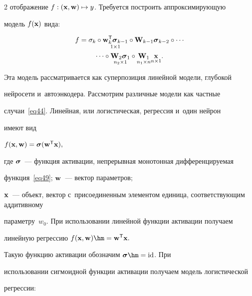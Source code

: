 \begin{multicols}{2}
отображение $f:({\mathbf{x}},{\mathbf{w}})\mapsto y$. Требуется построить аппроксимирующую 


модель $f({\mathbf{x}})$ вида:


\begin{multline}


\label{eq44}


f = \sigma_k\circ\underset{1\times1}{\wm_k^\mathsf{T}\sigmab_{k-


1}}\circ\mathbf{W}_{k-1}\sigmab_{k-2}\circ\cdots\\


\cdots \circ\underset{n_2 \times 


1}{\mathbf{W}_2\sigmab_1}\circ \underset{n_1 \times n}{\mathbf{W}_1}\underset{n \times 1}{\x}.


\end{multline}


Эта модель рассматривается как суперпозиция линейной модели, глубокой 


нейросети и~автоэнкодера. Рассмотрим различные модели как частные 


случаи~\eqref{eq44}. Линейная, или логистическая, регрессия и~один нейрон 


имеют вид




 $f({\mathbf{x}},{\mathbf{w}})={\boldsymbol{\sigma}}({\mathbf{w}}^\mathsf{T}{\mathbf{x}}),$




где ${\boldsymbol{\sigma}}$~--- функция активации, непрерывная монотонная дифференцируемая 


функция~\eqref{eq49};  ${\mathbf{w}}$~--- вектор параметров; 


${\mathbf{x}}$~--- объект, вектор с~присоединенным элементом единица, соответствующим аддитивному 


параметру~$w_0$. При использовании линейной функции активации получаем 


линейную регрессию $f(\xb,\wm)\hm=\wm^\mathsf{T}\xb.$





Такую функцию активации обозначим $\sigmab \hm= \mathrm{id} $. При 


использовании сигмоидной функции активации получаем модель логистической 


регрессии: 


\begin{equation}


\label{eq49}



\end{equation}
\end{multicols}
